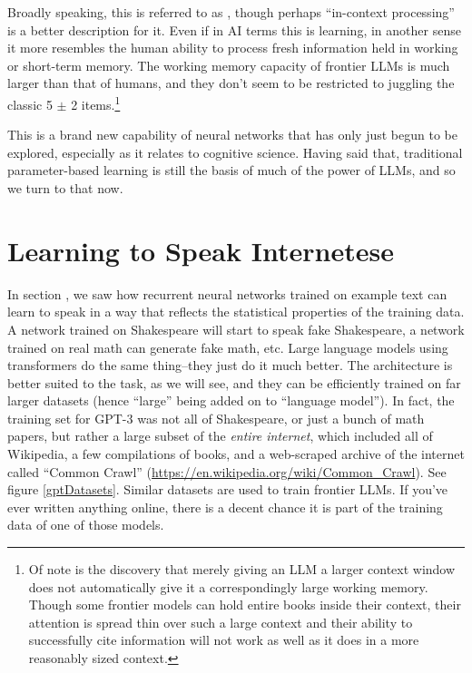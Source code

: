 Broadly speaking, this is referred to as , though
perhaps ``in-context processing'' is a better description for it. Even if in AI
terms this is learning, in another sense it more resembles the human ability to
process fresh information held in working or short-term memory. The working
memory capacity of frontier LLMs is much larger than that of humans, and they
don't seem to be restricted to juggling the classic 5 $\pm$ 2
items.\footnote{Of note is the discovery that merely giving an LLM a larger
context window does not automatically give it a correspondingly large working
memory. Though some frontier models can hold entire books inside their context,
their attention is spread thin over such a large context and their ability to
successfully cite information will not work as well as it does in a more
reasonably sized context.}

This is a brand new capability of neural networks that has only just begun to
be explored, especially as it relates to cognitive science. Having said that,
traditional parameter-based learning is still the basis of much of the power of
LLMs, and so we turn to that now.

\section{Learning to Speak Internetese}\label{internetese}

In section , we saw how recurrent neural
networks trained on example text can learn to speak in a way that reflects the
statistical properties of the training data. A network trained on Shakespeare
will start to speak fake Shakespeare, a network trained on real math can
generate fake math, etc. Large language models using transformers do the same
thing--they just do it much better. The architecture is better suited to the
task, as we will see, and they can be efficiently trained on far larger
datasets (hence ``large'' being added on to ``language model''). In fact, the
training set for GPT-3 was not all of Shakespeare, or just a bunch of math
papers, but rather a large subset of the \emph{entire internet}, which included
all of Wikipedia, a few compilations of books, and a web-scraped archive of the
internet called ``Common Crawl''
(\url{https://en.wikipedia.org/wiki/Common_Crawl}). See figure
\ref{gptDatasets}. Similar datasets are used to train frontier LLMs. If you've
ever written anything online, there is a decent chance it is part of the
training data of one of those models.

